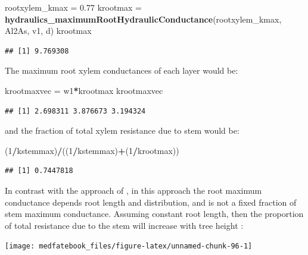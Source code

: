 \documentclass[]{book}
\newenvironment{Shaded}{\begin{snugshade}}{\end{snugshade}}
\newcommand{\KeywordTok}[1]{\textcolor[rgb]{0.13,0.29,0.53}{\textbf{#1}}}
\newcommand{\DecValTok}[1]{\textcolor[rgb]{0.00,0.00,0.81}{#1}}
\newcommand{\FloatTok}[1]{\textcolor[rgb]{0.00,0.00,0.81}{#1}}
\newcommand{\StringTok}[1]{\textcolor[rgb]{0.31,0.60,0.02}{#1}}
\newcommand{\OperatorTok}[1]{\textcolor[rgb]{0.81,0.36,0.00}{\textbf{#1}}}
\newcommand{\NormalTok}[1]{#1}
\begin{document}
\begin{Shaded}
\begin{Highlighting}[]
\NormalTok{rootxylem_kmax =}\StringTok{ }\FloatTok{0.77}
\NormalTok{krootmax =}\StringTok{ }\KeywordTok{hydraulics_maximumRootHydraulicConductance}\NormalTok{(rootxylem_kmax, Al2As, }
\NormalTok{                                                      v1, d)}
\NormalTok{krootmax}
\end{Highlighting}
\end{Shaded}

\begin{verbatim}
## [1] 9.769308
\end{verbatim}

The maximum root xylem conductances of each layer would be:

\begin{Shaded}
\begin{Highlighting}[]
\NormalTok{krootmaxvec =}\StringTok{ }\NormalTok{w1}\OperatorTok{*}\NormalTok{krootmax}
\NormalTok{krootmaxvec}
\end{Highlighting}
\end{Shaded}

\begin{verbatim}
## [1] 2.698311 3.876673 3.194324
\end{verbatim}

and the fraction of total xylem resistance due to stem would be:

\begin{Shaded}
\begin{Highlighting}[]
\NormalTok{(}\DecValTok{1}\OperatorTok{/}\NormalTok{kstemmax)}\OperatorTok{/}\NormalTok{((}\DecValTok{1}\OperatorTok{/}\NormalTok{kstemmax)}\OperatorTok{+}\NormalTok{(}\DecValTok{1}\OperatorTok{/}\NormalTok{krootmax))}
\end{Highlighting}
\end{Shaded}

\begin{verbatim}
## [1] 0.7447818
\end{verbatim}

In contrast with the approach of \citet{Christoffersen2016}, in this approach the root maximum conductance depends root length and distribution, and is not a fixed fraction of stem maximum conductance. Assuming constant root length, then the proportion of total resistance due to the stem will increase with tree height \citep{Magnani2000}:

\begin{center}\texttt{[image: medfatebook\_files/figure-latex/unnamed-chunk-96-1]} \end{center}
\end{document}
